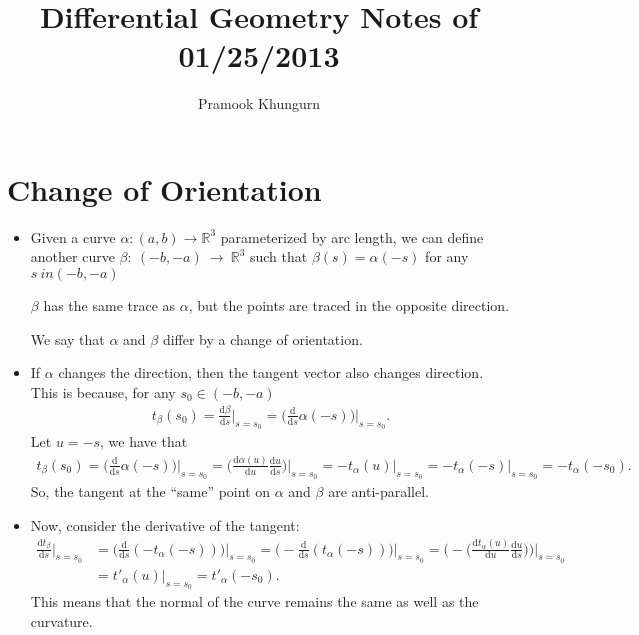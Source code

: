 \documentclass[10pt]{article}
\title{Differential Geometry Notes of 01/25/2013}
\author{Pramook Khungurn}
\newcommand{\dee}{\mathrm{d}}
\newcommand{\ra}{\rightarrow}
\begin{document}
	\maketitle

  \section{Change of Orientation} %
  \label{sec:change_of_orientation}
  
  \begin{itemize}
    \item Given a curve $\alpha: (a,b) \ra \mathbb{R}^3$ parameterized by arc length, we can define another curve $\beta:~(-b,-a)~\ra~\mathbb{R}^3$ such that $\beta(s) = \alpha(-s)$ for any $s \ in (-b,-a)$

    $\beta$ has the same trace as $\alpha$, but the points are traced in the opposite direction.

    We say that $\alpha$ and $\beta$ differ by a change of orientation.

    \item If $\alpha$ changes the direction, then the tangent vector also changes direction. This is because, for any $s_0 \in (-b,-a)$
    \begin{align*}
      t_\beta(s_0) = \frac{\dee \beta}{\dee s} \bigg|_{s = s_0} = \bigg( \frac{\dee }{\dee s} \alpha(-s) \bigg) \bigg|_{s=s_0}.
    \end{align*}
    Let $u = -s$, we have that
    \begin{align*}
      t_\beta(s_0) 
      = \bigg( \frac{\dee }{\dee s} \alpha(-s) \bigg) \bigg|_{s=s_0} = \bigg( \frac{\dee \alpha(u)}{\dee u} \frac{\dee u}{\dee s} \bigg) \bigg|_{s=s_0}
      = -t_\alpha(u) \bigg|_{s=s_0} = -t_\alpha(-s)\bigg|_{s=s_0} = -t_\alpha(-s_0).
    \end{align*}
    So, the tangent at the ``same'' point on $\alpha$ and $\beta$ are anti-parallel.

    \item Now, consider the derivative of the tangent:
    \begin{align*}
      \frac{\dee t_\beta}{\dee s} \bigg|_{s = s_0}
      &= \bigg( \frac{\dee }{\dee s} (-t_\alpha(-s)) \bigg) \bigg|_{s=s_0}
      = \bigg( -\frac{\dee }{\dee s} (t_\alpha(-s)) \bigg) \bigg|_{s=s_0}
      = \bigg( -\bigg( \frac{\dee t_\alpha(u)}{\dee u} \frac{\dee u}{\dee s} \bigg) \bigg) \bigg|_{s=s_0}\\
      &= t'_\alpha(u) \bigg|_{s=s_0} = t'_\alpha(-s_0).
    \end{align*}
    This means that the normal of the curve remains the same as well as the curvature.


\end{itemize}
\end{document}
